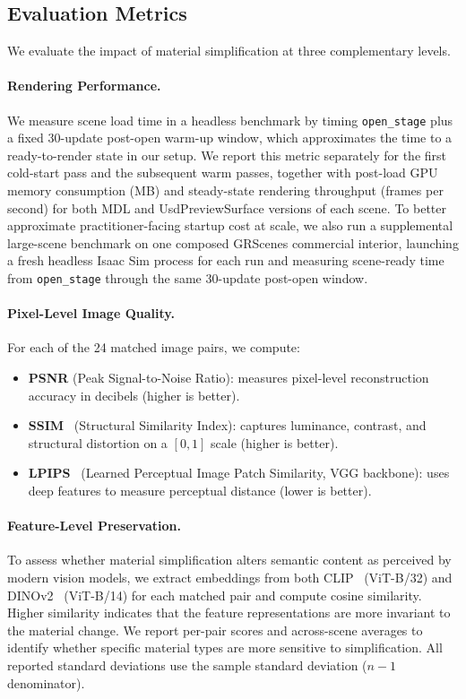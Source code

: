 \subsection{Evaluation Metrics}
\label{sec:metrics}

We evaluate the impact of material simplification at three complementary levels.

\paragraph{Rendering Performance.}
We measure scene load time in a headless benchmark by timing
\texttt{open\_stage} plus a fixed 30-update post-open warm-up window, which
approximates the time to a ready-to-render state in our setup. We report this
metric separately for the first cold-start pass and the subsequent warm passes,
together with post-load GPU memory consumption (MB) and steady-state rendering
throughput (frames per second) for both MDL and UsdPreviewSurface versions of
each scene. To better approximate practitioner-facing startup cost at scale, we
also run a supplemental large-scene benchmark on one composed GRScenes
commercial interior, launching a fresh headless Isaac Sim process for each run
and measuring scene-ready time from \texttt{open\_stage} through the same
30-update post-open window.

\paragraph{Pixel-Level Image Quality.}
For each of the 24 matched image pairs, we compute:
\begin{itemize}
    \item \textbf{PSNR} (Peak Signal-to-Noise Ratio): measures pixel-level
    reconstruction accuracy in decibels (higher is better).
    \item \textbf{SSIM}~\cite{Wang2004Image} (Structural Similarity Index):
    captures luminance, contrast, and structural distortion on a $[0,1]$ scale
    (higher is better).
    \item \textbf{LPIPS}~\cite{Zhang2018Unreasonable} (Learned Perceptual
    Image Patch Similarity, VGG backbone): uses deep features to measure
    perceptual distance (lower is better).
\end{itemize}

\paragraph{Feature-Level Preservation.}
To assess whether material simplification alters semantic content as perceived
by modern vision models, we extract embeddings from both
CLIP~\cite{Radford2021Learning} (ViT-B/32) and
DINOv2~\cite{Oquab2023DINOv2} (ViT-B/14) for each matched pair and compute
cosine similarity. Higher similarity indicates that the feature
representations are more invariant to the material change. We report
per-pair scores and across-scene averages to identify whether specific material
types are more sensitive to simplification. All reported standard deviations use the sample standard deviation ($n-1$ denominator).
